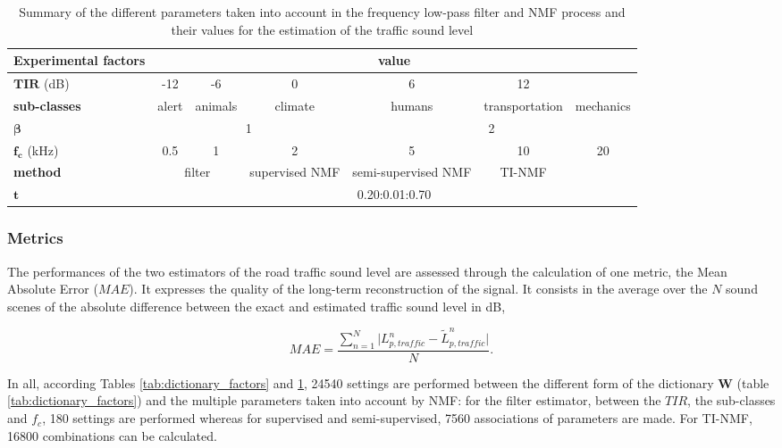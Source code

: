 \documentclass[twocolumn,a4paper,10pt]{article}
\begin{document}
\begin{table}[]
\centering
\begin{tabular}{lcccccc}
\textbf{Experimental factors} &  \multicolumn{6}{c}{value}\\ \hline
$\mathbf{TIR}$ (dB) & -12 & -6 & 0 & 6 & 12 &  \\ \hline
\textbf{sub-classes} & alert & animals & climate & humans & transportation & mechanics \\ \hline
$\mathbf{\beta}$ & \multicolumn{3}{c}{1} & \multicolumn{3}{c}{2} \\ \hline
$\mathbf{f_c}$ (kHz) & 0.5 & 1 & 2 & 5 & 10 & 20 \\ \hline
\textbf{method} & \multicolumn{2}{c}{filter} & supervised NMF & semi-supervised NMF & TI-NMF \\ \hline
$\mathbf{t}$ & \multicolumn{6}{c}{0.20:0.01:0.70} \\ \hline
\end{tabular}
\caption{Summary of the different parameters taken into account in the frequency low-pass filter and NMF process and their values for the estimation of the traffic sound level}
\label{tab:estimation_factors}
\end{table}


\subsubsection{Metrics}
The performances of the two estimators of the road traffic sound level are assessed through the calculation of one metric, the Mean Absolute Error ($MAE$). It expresses the quality of the long-term reconstruction of the signal. It consists in the average over the $N$ sound scenes of the absolute difference between the exact and estimated traffic sound level in dB,

\begin{equation}
MAE = \frac{\sum_{n = 1}^N\vert L^n_{p,traffic}-\tilde{L}^n_{p,traffic} \vert}{N}.
\end{equation}

In all, according Tables \ref{tab:dictionary_factors} and \ref{tab:estimation_factors}, 24540 settings are performed between the different form of the dictionary $\mathbf{W}$ (table \ref{tab:dictionary_factors}) and the multiple parameters taken into account by NMF:  for the filter estimator, between the $TIR$, the sub-classes and $f_c$, 180 settings are performed whereas for supervised and semi-supervised, 7560 associations of parameters are made. For TI-NMF, 16800 combinations can be calculated.
\end{document}
